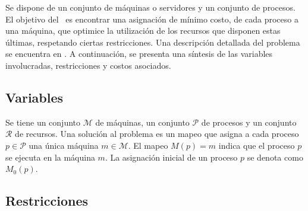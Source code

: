 
Se dispone de un conjunto  de máquinas o servidores y un conjunto de procesos. El objetivo del \mrp\ es encontrar una asignación de mínimo costo, de cada proceso a una máquina, que optimice la utilización de los recursos que disponen estas últimas, respetando ciertas restricciones. Una descripción detallada del problema se encuentra en \cite{2012ProblemDefinition}. A continuación, se presenta una síntesis de las variables involucradas, restricciones y costos asociados.

\subsection{Variables}
Se tiene un conjunto $\mathcal{M}$ de máquinas, un conjunto $\mathcal{P}$ de procesos y un conjunto $\mathcal{R}$ de recursos. Una solución al problema es un mapeo que asigna a cada proceso $p \in \mathcal{P}$ una única máquina $m \in \mathcal{M}$. El mapeo $M(p) = m$ indica que el proceso $p$ se ejecuta en la máquina $m$. La asignación inicial de un proceso $p$ se denota como $M_0(p)$.


\subsection{Restricciones}

